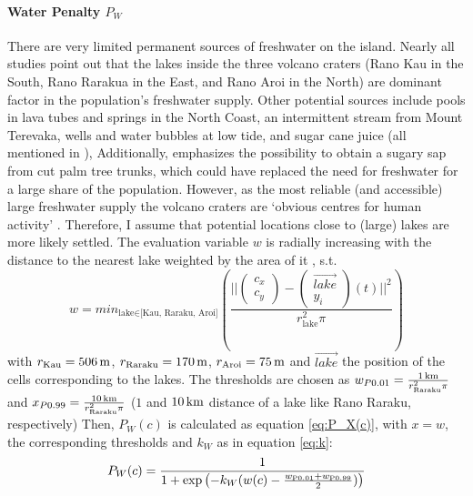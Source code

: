 \paragraph{Water Penalty $P_W$}
There are very limited permanent sources of freshwater on the island. 
Nearly all studies point out that the lakes inside the three volcano craters (Rano Kau in the South, Rano Rarakua in the East, and Rano Aroi in the North) are dominant factor in the population's freshwater supply.
Other potential sources include pools in lava tubes and springs in the North Coast, an intermittent stream from Mount Terevaka, wells and water bubbles at low tide, and sugar cane juice (all mentioned in \citep{Diamond2011}), 
Additionally, \citet{Mieth2015} emphasizes the possibility to obtain a sugary sap from cut palm tree trunks, which could have replaced the need for freshwater for a large share of the population.
However, as the most reliable (and accessible) large freshwater supply the volcano craters are `obvious centres for human activity' \citep{Bahn2017}.
Therefore, I assume that potential locations close to (large) lakes are more likely settled.
The evaluation variable $w$ is radially increasing with the distance to the nearest lake weighted by the area of it , s.t.\
\begin{equation}
	w = min_{\text{lake}\in \text{[Kau, Raraku, Aroi]}} \left( \frac{||
		\begin{pmatrix} c_x \\ c_y \end{pmatrix}  - \begin{pmatrix} \vec{lake}\\ y_i \end{pmatrix}(t)||^2}{r_\text{lake}^2\pi} \right)
\end{equation}
with $r_\text{Kau} = 506\, \rm{m}$, $r_\text{Raraku} = 170\, \rm{m}$, $r_\text{Aroi} = 75\, \rm{m}$ and $\vec{lake}$ the position of the cells corresponding to the lakes.
The thresholds are chosen as $w_{P0.01} = \frac{1\, {\rm km}}{r_\text{Raraku}^2\pi}$ and $x_{P0.99}=\frac{10\, {\rm km}}{r_\text{Raraku}^2\pi}$ ($1$ and $10\, {\rm km}$ distance of a lake like Rano Raraku, respectively)
Then, $P_W(c)$ is calculated as equation \ref{eq:P_X(c)}, with $x=w$, the corresponding thresholds and $k_W$ as in equation \ref{eq:k}:
\begin{equation}
	P_W(c) = \frac{1}{1+\exp\left( - k_W (w(c)-\frac{w_{\rm P0.01}+w_{\rm P0.99}}{2}) \right)}
\end{equation}

